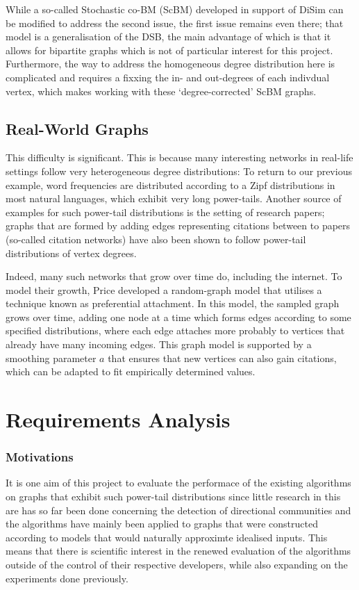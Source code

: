 While a so-called Stochastic co-BM (ScBM) developed in support of DiSim can be modified to address 
the second issue, the first issue remains even there; that model is a generalisation of the DSB, 
the main advantage of which is that it allows for bipartite graphs which is not of particular 
interest for this project. Furthermore, the way to address the homogeneous degree distribution 
here is complicated and requires a fixxing the in- and out-degrees of each indivdual vertex, which 
makes working with these `degree-corrected' ScBM graphs. 

\subsection{Real-World Graphs}
This difficulty is significant. This is because many interesting networks in real-life settings 
follow very heterogeneous degree distributions: To return to our previous example, word frequencies
are distributed according to a Zipf distributions in most natural languages, which exhibit very 
long power-tails. Another source of examples for such power-tail distributions is the setting of 
research papers; graphs that are formed by adding edges representing citations between to papers 
(so-called citation networks) have also been shown to follow power-tail distributions of vertex 
degrees. 

Indeed, many such networks that grow over time do, including the internet. To model their growth, 
Price developed a random-graph model that utilises a technique known as preferential attachment. 
In this model, the sampled graph grows over time, adding one node at a time which forms edges 
according to some specified distributions, where each edge attaches more probably to vertices that
already have many incoming edges. This graph model is supported by a smoothing parameter $a$ that 
ensures that new vertices can also gain citations, which can be adapted to fit empirically determined
values.

\section{Requirements Analysis}

\subsubsection{Motivations}
It is one aim of this project to evaluate the performace of the existing algorithms on graphs 
that exhibit such power-tail distributions since little research in this are has so far been done
concerning the detection of directional communities and the algorithms have mainly been applied to 
graphs that were constructed according to models that would naturally approximte idealised inputs.
This means that there is scientific interest in the renewed evaluation of the algorithms outside of
the control of their respective developers, while also expanding on the experiments done previously.

